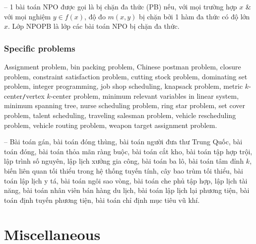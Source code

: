 \documentclass{article}
\begin{document}
-- 1 bài toán NPO được gọi là bị chặn đa thức (PB) nếu, với mọi trường hợp $x$ \& với mọi nghiệm $y\in f(x)$, độ đo $m(x,y)$ bị chặn bởi 1 hàm đa thức có độ lớn $x$. Lớp NPOPB là lớp các bài toán NPO bị chặn đa thức.


\subsubsection{Specific problems}
Assignment problem, bin packing problem, Chinese postman problem, closure problem, constraint satisfaction problem, cutting stock problem, dominating set problem, integer programming, job shop scheduling, knapsack problem, metric $k$-center{\tt/}vertex $k$-center problem, minimum relevant variables in linear system, minimum spanning tree, nurse scheduling problem, ring star problem, set cover problem, talent scheduling, traveling salesman problem, vehicle rescheduling problem, vehicle routing problem, weapon target assignment problem.

-- Bài toán gán, bài toán đóng thùng, bài toán người đưa thư Trung Quốc, bài toán đóng, bài toán thỏa mãn ràng buộc, bài toán cắt kho, bài toán tập hợp trội, lập trình số nguyên, lập lịch xưởng gia công, bài toán ba lô, bài toán tâm đỉnh $k$, biến liên quan tối thiểu trong hệ thống tuyến tính, cây bao trùm tối thiểu, bài toán lập lịch y tá, bài toán ngôi sao vòng, bài toán che phủ tập hợp, lập lịch tài năng, bài toán nhân viên bán hàng du lịch, bài toán lập lịch lại phương tiện, bài toán định tuyến phương tiện, bài toán chỉ định mục tiêu vũ khí.


\section{Miscellaneous}


\printbibliography[heading=bibintoc]
\end{document}
